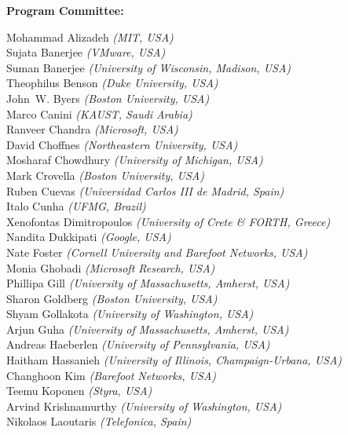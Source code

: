\documentclass[sigconf]{acmart}
\begin{document}
\begin{minipage}[t]{.3\textwidth}
{\bf Program Committee:}
\end{minipage}
\begin{minipage}[t]{.9\textwidth}
Mohammad Alizadeh {\it	(MIT, USA)}\\
Sujata Banerjee {\it (VMware, USA)}\\
Suman Banerjee {\it (University of Wisconsin, Madison, USA)}\\
Theophilus Benson {\it (Duke University, USA)}\\
John~W. Byers {\it (Boston University, USA)}\\
Marco Canini {\it (KAUST, Saudi Arabia)}\\
Ranveer Chandra {\it (Microsoft, USA)}\\
David Choffnes {\it (Northeastern University, USA)}\\
Mosharaf Chowdhury {\it (University of Michigan, USA)}\\
Mark	 Crovella {\it (Boston University, USA)}\\
Ruben Cuevas {\it (Universidad Carlos III de Madrid, Spain)}\\
Italo Cunha {\it (UFMG, Brazil)}\\
Xenofontas Dimitropoulos {\it (University of Crete \& FORTH, Greece)}\\
Nandita Dukkipati {\it (Google, USA)}\\
Nate	Foster {\it (Cornell University and Barefoot Networks, USA)}\\
Monia Ghobadi	 {\it (Microsoft Research, USA)}\\
Phillipa Gill {\it (University of Massachusetts, Amherst, USA)}\\
Sharon Goldberg {\it (Boston University, USA)}\\
Shyam Gollakota {\it (University of Washington, USA)}\\
Arjun Guha {\it (University of Massachusetts, Amherst, USA)}\\
Andreas Haeberlen {\it (University of Pennsylvania, USA)}\\
Haitham Hassanieh {\it (University of Illinois, Champaign-Urbana, USA)}\\
Changhoon Kim {\it (Barefoot Networks, USA)}\\
Teemu Koponen {\it (Styra, USA)}\\
Arvind Krishnamurthy {\it (University of Washington, USA)}\\
Nikolaos Laoutaris {\it (Telefonica, Spain)}\\

\end{minipage}
\end{document}
